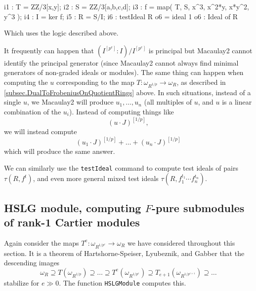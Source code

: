 \documentclass{amsart}
\begin{document}
\medskip
{\small
\begin{MyVerbatim}
i1 : T = ZZ/3[x,y];
i2 : S = ZZ/3[a,b,c,d];
i3 : f = map( T, S, { x^3, x^2*y, x*y^2, y^3 } );
i4 : I = ker f;
i5 : R = S/I;
i6 : testIdeal R
o6 = ideal 1
o6 : Ideal of R
\end{MyVerbatim}
}\medskip

Which uses the logic described above.

\begin{remark}
It frequently can happen that $(I^{[p^e]} : I)/I^{[p^e]}$ is principal but Macaulay2 cannot identify the principal generator (since Macaulay2 cannot always find minimal generators of non-graded ideals or modules).  The same thing can happen when computing the $u$ corresponding to the map $T : \omega_{R^{1/p}} \to \omega_R$, as described in \autoref{subsec.DualToFrobeniusOnQuotientRings} above.  In such situations, instead of a single $u$, we Macaulay2 will produce $u_1, \dots, u_n$ (all multiples of $u$, and $u$ is a linear combination of the $u_i$).  Instead of computing things like
\[
(u \cdot J)^{[1/p]},
\]
we will instead compute
\[
(u_1 \cdot J)^{[1/p]} + \dots + (u_n \cdot J)^{[1/p]}
\]
which will produce the same answer.
\end{remark}

We can similarly use the \texttt{testIdeal} command to compute test ideals of pairs $\tau(R, f^t)$, and even more general mixed test ideals $\tau(R, f_1^{t_1} \cdots f_n^{t_n})$.

\subsection{HSLG module, computing $F$-pure submodules of rank-1 Cartier modules}

Again consider the maps $T^e : \omega_{R^{1/p^e}} \to \omega_R$ we have considered throughout this section.  It is a theorem of Hartshorne-Speiser, Lyubeznik, and Gabber \cite{HartshorneSpeiserLocalCohomologyInCharacteristicP,LyubeznikFModulesApplicationsToLocalCohomology,Gabber.tStruc} that the descending images
\[
\omega_R \supseteq T(\omega_{R^{1/p}}) \supseteq \dots \supseteq T^e(\omega_{R^{1/p^e}}) \supseteq T_{e+1}(\omega_{R^{1/p^{e+1}}}) \supseteq \dots
\]
stabilize for $e \gg 0$.  The function \texttt{HSLGModule} computes this.

\medskip
{\small
{}
}\medskip
\end{document}

